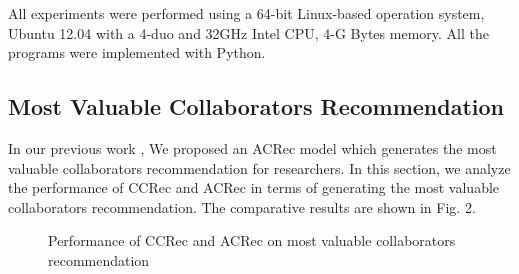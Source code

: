 \documentclass[review]{elsarticle}
\begin{document}
All experiments were performed using a 64-bit Linux-based operation system, Ubuntu 12.04 with a 4-duo and 32GHz Intel CPU, 4-G Bytes memory. All the programs were implemented with Python.

\subsection{Most Valuable Collaborators Recommendation}
In our previous work \cite{li2014acrec}, We proposed an ACRec model which generates the most valuable collaborators recommendation for researchers. In this section, we analyze the performance of CCRec and ACRec in terms of generating the most valuable collaborators recommendation. The comparative results are shown in Fig. 2.

\begin{figure}
\centering
{}
\caption{Performance of CCRec and ACRec on most valuable collaborators recommendation}
\label{fig:2}
\end{figure}
\end{document}
